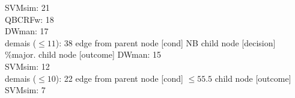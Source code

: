 {{{SVMsim: 21\\
QBCRFw: 18\\
DWman: 17\\
demais ($\leq 11$): 38} edge from parent node [cond] {NB}}
child {node [decision] {\%major.}
child {node [outcome] {
DWman: 15\\
SVMsim: 12\\
demais ($\leq 10$): 22} edge from parent node [cond] {$\leq55.5$}}
child {node [outcome] {
SVMsim: 7\\
}}}}
